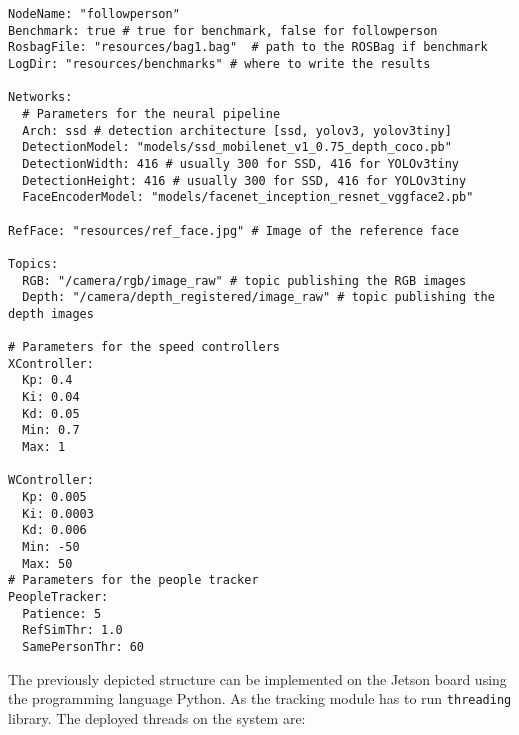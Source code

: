 \begin{lstlisting}
NodeName: "followperson"
Benchmark: true # true for benchmark, false for followperson
RosbagFile: "resources/bag1.bag"  # path to the ROSBag if benchmark 
LogDir: "resources/benchmarks" # where to write the results

Networks:
  # Parameters for the neural pipeline
  Arch: ssd # detection architecture [ssd, yolov3, yolov3tiny]
  DetectionModel: "models/ssd_mobilenet_v1_0.75_depth_coco.pb"
  DetectionWidth: 416 # usually 300 for SSD, 416 for YOLOv3tiny
  DetectionHeight: 416 # usually 300 for SSD, 416 for YOLOv3tiny
  FaceEncoderModel: "models/facenet_inception_resnet_vggface2.pb"

RefFace: "resources/ref_face.jpg" # Image of the reference face

Topics:
  RGB: "/camera/rgb/image_raw" # topic publishing the RGB images
  Depth: "/camera/depth_registered/image_raw" # topic publishing the depth images

# Parameters for the speed controllers
XController:
  Kp: 0.4
  Ki: 0.04
  Kd: 0.05
  Min: 0.7
  Max: 1

WController:
  Kp: 0.005
  Ki: 0.0003
  Kd: 0.006
  Min: -50
  Max: 50
# Parameters for the people tracker
PeopleTracker:
  Patience: 5
  RefSimThr: 1.0
  SamePersonThr: 60
\end{lstlisting}


The previously depicted structure can be implemented on the Jetson board using the programming language Python. As the tracking module has to run \texttt{threading} library. The deployed threads on the system are:

